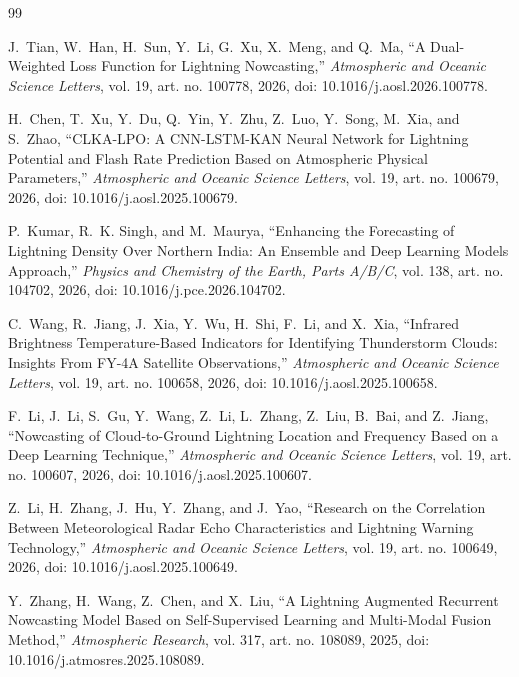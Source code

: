 \documentclass[12pt,a4paper]{report}
\begin{document}
\newpage
\begin{thebibliography}{99}
\thispagestyle{empty}

J.~Tian, W.~Han, H.~Sun, Y.~Li, G.~Xu, X.~Meng, and Q.~Ma, ``A Dual-Weighted Loss Function for Lightning Nowcasting,'' \emph{Atmospheric and Oceanic Science Letters}, vol. 19, art. no. 100778, 2026, doi: 10.1016/j.aosl.2026.100778.

H.~Chen, T.~Xu, Y.~Du, Q.~Yin, Y.~Zhu, Z.~Luo, Y.~Song, M.~Xia, and S.~Zhao, ``CLKA-LPO: A CNN-LSTM-KAN Neural Network for Lightning Potential and Flash Rate Prediction Based on Atmospheric Physical Parameters,'' \emph{Atmospheric and Oceanic Science Letters}, vol. 19, art. no. 100679, 2026, doi: 10.1016/j.aosl.2025.100679.

P.~Kumar, R.~K. Singh, and M.~Maurya, ``Enhancing the Forecasting of Lightning Density Over Northern India: An Ensemble and Deep Learning Models Approach,'' \emph{Physics and Chemistry of the Earth, Parts A/B/C}, vol. 138, art. no. 104702, 2026, doi: 10.1016/j.pce.2026.104702.

C.~Wang, R.~Jiang, J.~Xia, Y.~Wu, H.~Shi, F.~Li, and X.~Xia, ``Infrared Brightness Temperature-Based Indicators for Identifying Thunderstorm Clouds: Insights From FY-4A Satellite Observations,'' \emph{Atmospheric and Oceanic Science Letters}, vol. 19, art. no. 100658, 2026, doi: 10.1016/j.aosl.2025.100658.

F.~Li, J.~Li, S.~Gu, Y.~Wang, Z.~Li, L.~Zhang, Z.~Liu, B.~Bai, and Z.~Jiang, ``Nowcasting of Cloud-to-Ground Lightning Location and Frequency Based on a Deep Learning Technique,'' \emph{Atmospheric and Oceanic Science Letters}, vol. 19, art. no. 100607, 2026, doi: 10.1016/j.aosl.2025.100607.

Z.~Li, H.~Zhang, J.~Hu, Y.~Zhang, and J.~Yao, ``Research on the Correlation Between Meteorological Radar Echo Characteristics and Lightning Warning Technology,'' \emph{Atmospheric and Oceanic Science Letters}, vol. 19, art. no. 100649, 2026, doi: 10.1016/j.aosl.2025.100649.

Y.~Zhang, H.~Wang, Z.~Chen, and X.~Liu, ``A Lightning Augmented Recurrent Nowcasting Model Based on Self-Supervised Learning and Multi-Modal Fusion Method,'' \emph{Atmospheric Research}, vol. 317, art. no. 108089, 2025, doi: 10.1016/j.atmosres.2025.108089.


\end{thebibliography}
\end{document}
